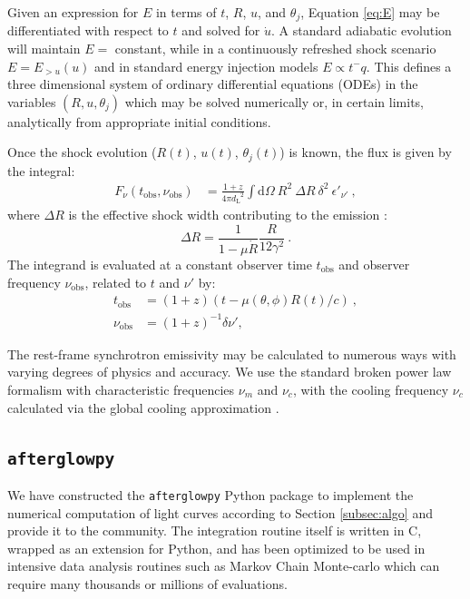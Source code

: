 \documentclass[twocolumn]{aastex62}
\newcommand{\afterglowpy}{{\tt afterglowpy}}
\newcommand{\dd}{\ensuremath{\mathrm{d}}}
\newcommand{\tobs}{\ensuremath{t_{\mathrm{obs}}}}
\newcommand{\nuobs}{\ensuremath{\nu_{\mathrm{obs}}}}
\newcommand{\dL}{\ensuremath{d_{\mathrm{L}}}}
\begin{document}
Given an expression for $E$ in terms of $t$, $R$, $u$, and $\theta_j$, Equation \eqref{eq:E} may be differentiated with respect to $t$ and solved for $\dot{u}$. A standard adiabatic evolution will maintain $E=$ constant, while in a continuously refreshed shock scenario $E = E_{>u}(u)$ and in standard energy injection models $E \propto t^-q$.  This defines a three dimensional system of ordinary differential equations (ODEs) in the variables $(R, u, \theta_j)$ which may be solved numerically or, in certain limits, analytically from appropriate initial conditions.

Once the shock evolution ($R(t)$, $u(t)$, $\theta_j(t)$) is known, the flux is given by the integral:
\begin{align}
	F_\nu(\tobs, \nuobs) &= \frac{1+z}{4\pi \dL^2} \int \! \dd \Omega\ R^2\ \Delta R\  \delta^2\ \epsilon'_{\nu'} \ , \label{eq:flux2}
\end{align}
where $\Delta R$ is the effective shock width contributing to the emission \citep{van-Eerten:2010aa}:
\begin{equation}
	\Delta R = \frac{1}{1-\mu \dot{R}} \frac{R}{12\gamma^2} \ . \label{eq:dr}
\end{equation}
 The integrand is evaluated at a constant observer time $\tobs$ and observer frequency $\nuobs$, related to $t$ and $\nu'$ by:
\begin{align}
	\tobs &= (1+z) \left(t - \mu(\theta, \phi) R(t)/c\right)\ , \label{eq:tobs} \\
	\nuobs &= (1+z)^{-1} \delta \nu' , \label{eq:nuobs}
\end{align}

The rest-frame synchrotron emissivity may be calculated to numerous ways with varying degrees of physics and accuracy.  We use the standard broken power law formalism with characteristic frequencies $\nu_m$ and $\nu_c$, with the cooling frequency $\nu_c$ calculated via the global cooling approximation \citep{Granot:2002aa, van-Eerten:2010aa}.


\subsection{\afterglowpy{}} \label{subsec:afterglowpy}


We have constructed the \afterglowpy{} Python package to implement the numerical computation of light curves according to Section \ref{subsec:algo} and provide it to the community.  The integration routine itself is written in C, wrapped as an extension for Python, and has been optimized to be used in intensive data analysis routines such as Markov Chain Monte-carlo which can require many thousands or millions of evaluations.  
\end{document}
